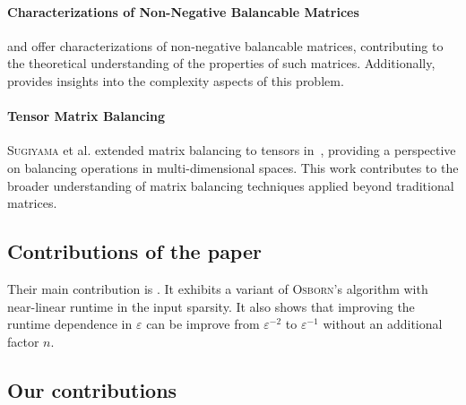 \paragraph*{Characterizations of Non-Negative Balancable Matrices} \cite{osborne1960pre} and \cite{eaves1985line} offer characterizations of non-negative balancable matrices, contributing to the theoretical understanding of the properties of such matrices. Additionally, \cite{kalantari1997complexity} provides insights into the complexity aspects of this problem.

\paragraph*{Tensor Matrix Balancing} \textsc{Sugiyama} et al. extended matrix balancing to tensors in~\cite{sugiyama2017tensor}, providing a perspective on balancing operations in multi-dimensional spaces. This work contributes to the broader understanding of matrix balancing techniques applied beyond traditional matrices.

\subsection{Contributions of the paper}

Their main contribution is . It exhibits a variant of \textsc{Osborn}'s algorithm with near-linear runtime in the input sparsity. It also shows that improving the runtime dependence in \(\varepsilon\) can be improve from \(\varepsilon^{-2}\) to \(\varepsilon^{-1}\) without an additional factor \(n\).  


\subsection{Our contributions}

